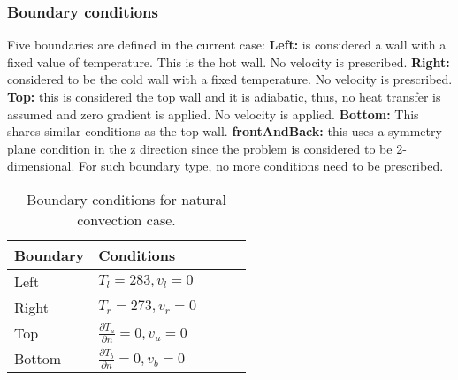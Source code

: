\subsubsection*{Boundary conditions}
\setlength{\parindent}{0.5cm} Five boundaries are defined in the current case:
\newline
\textbf{Left:} is considered a wall with a fixed value of temperature. This is the hot wall. No velocity is prescribed.
\newline
\textbf{Right:} considered to be the cold wall with a fixed temperature. No velocity is prescribed.
\newline
\textbf{Top:} this is considered the top wall and it is adiabatic, thus, no heat transfer is assumed and zero gradient is applied. No velocity is applied.
\newline 
\textbf{Bottom:} This shares similar conditions as the top wall.
\newline
\textbf{frontAndBack:} this uses a symmetry plane condition in the z direction since the problem is considered to be 2-dimensional. For such boundary type, no more conditions need to be prescribed.
\begin{table}[h!]
	\begin{tabular}{@{}lllll@{}}
		\toprule[1pt]
		\textbf{Boundary} & \textbf{Conditions}  \\ \midrule[2pt]
		Left & $T_{l}=283, v_{l} = 0   $  \\
		Right & $T_{r}=273, v_{r} = 0 $ \\
		Top & $\frac{\partial T_{u}}{\partial n} = 0, v_{u} = 0$  \\
		Bottom & $\frac{\partial T_{b}}{\partial n} = 0, v_{b} = 0$  \\ \bottomrule[1pt]		
	\end{tabular}
	\centering
	\caption{Boundary conditions for natural convection case.}	
	\label{3.2tab}
\end{table}
\newline

